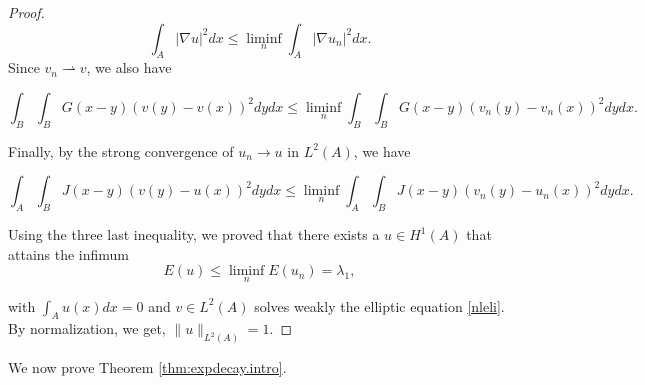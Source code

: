\documentclass[reqno]{amsart}
\numberwithin{equation}{section}
\begin{document}
\begin{proof}
$$\int_A |\nabla u|^2dx\leq \liminf_n\int_A |\nabla u_n|^2dx.$$
Since $v_n\rightharpoonup v$, we also have

$$\int_B\int_BG(x-y)(v(y)-v(x))^2dydx\leq \liminf_n\int_B\int_BG(x-y)(v_n(y)-v_n(x))^2dydx.$$

Finally, by the strong convergence of $u_n\to u$ in $L^2(A)$, we have

$$\int_A\int_BJ(x-y)(v(y)-u(x))^2dydx\leq \liminf_n\int_A\int_BJ(x-y)(v_n(y)-u_n(x))^2dydx.$$

Using the three last inequality, we proved that there exists a $u\in H^1(A)$ that attains the infimum $$E(u)\le \liminf_n E(u_n)=\lambda_1,$$

with $\int_A u(x)dx=0$ and $v\in L^2(A)$ solves weakly the elliptic equation \eqref{nleli}.
By normalization, we get, $\|u\|_{L^2(A)}=1$.
\end{proof}

We now prove Theorem \ref{thm:expdecay.intro}.
\end{document}
